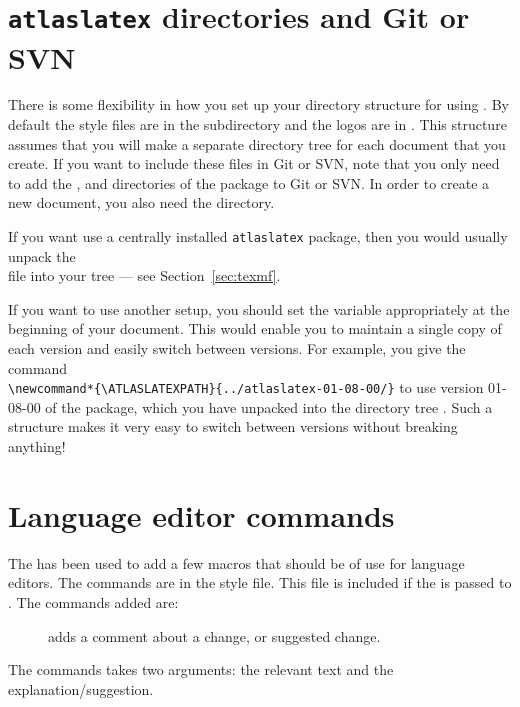 \section{\texttt{atlaslatex} directories and Git or SVN}
\label{sec:gitsvn}

There is some flexibility in how you set up your directory structure for using .
By default the  style files are in the  subdirectory and the
logos are in . This structure assumes that you will make a separate directory tree
for each document that you create.
If you want to include these files in Git or SVN, note that you only need to add the
,  and  directories of the  package to Git or SVN\@.
In order to create a new document, you also need the  directory.

If you want use a centrally installed \texttt{atlaslatex} package, then you would usually unpack the\\
 file into your  tree --- see Section~\ref{sec:texmf}.

If you want to use another setup, you should set the variable  appropriately
at the beginning of your document. This would enable you to maintain a single copy of each 
 version and easily switch between versions.
For example, you give the command\\
\verb|\newcommand*{\ATLASLATEXPATH}{../atlaslatex-01-08-00/}|
to use version 01-08-00 of the  package, which you have unpacked into the directory tree
.
Such a structure makes it very easy to switch between  versions without breaking anything!


\section{Language editor commands}%
\label{sec:langedit}

The  has been used to add a few macros that should be of use
for language editors. The commands are in the  style file.
This file is included if the  is passed to .
The commands added are:
\begin{description}
  \item[] adds a comment about a change, or suggested change.
\end{description}
The commands takes two arguments: the relevant text and the explanation/suggestion.

